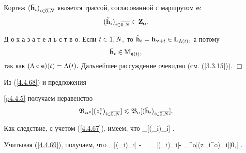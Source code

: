 \begin{pred}
\label{p4.4.5}{\TL}
Кортеж $(\tilde{\mathbf{h}}_i)_{i\in\ov{0,N}}$
является трассой, согласованной с маршрутом $\mathbf{e}:$
$$
  (\tilde{\mathbf{h}}_i)_{i\in\ov{0,N}}\in \mathbf{Z}_\mathbf{e}
  .
$$
\end{pred}

Д о к а з а т е л ь с т в о.
Если $t\in \ov{1,N},$
то
$\tilde{\mathbf{h}}_t = \mathbf{h}_{\upnu +t}\in {\mathbb L}_{\Lambda(t)},$
а потому
$$
  \tilde{\mathbf{h}}_t \in {\mathbb M}_{\mathbf{e}(t)}
  ,
$$
так как $(\Lambda \circ \mathbf{e})(t) = \Lambda(t).$
Дальнейшее рассуждение очевидно
(см. (\ref{3.3.15})).
\hfill $\Box$

Из (\ref{4.4.68}) и предложения~{\ref{p4.4.5} получаем неравенство
$$
  \mathfrak{B}_{\al^o}[(z_i^o)_{i\in\ov{0,N}}]\leqslant
  \mathfrak{B}_\mathbf{e}[(\tilde{\mathbf{h}}_i)_{i\in\ov{0,N}}]
  .
$$

Как следствие, с учетом (\ref{4.4.67}), имеем, что
\bfn
  \label{4.4.69}
   \leqslant {}_[(_i)_{i\in{}}]
  .
\efn

Учитывая (\ref{4.4.69}), получаем, что
\bfn
  \label{4.4.70}
  \kappa \df {}_[(_i)_{i\in{}}] -
   = _[(_i)_{i\in{}}]-
  _{\al^o}[(z_i^o)_{i\in{}}]\in [0,\infty[
  .
\efn

}
